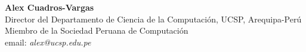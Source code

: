 \textbf{Alex Cuadros-Vargas}\\
Director del Departamento de Ciencia de la Computación, UCSP, Arequipa-Perú\\
Miembro de la Sociedad Peruana de Computación\\
email: \textit{alex@ucsp.edu.pe}
